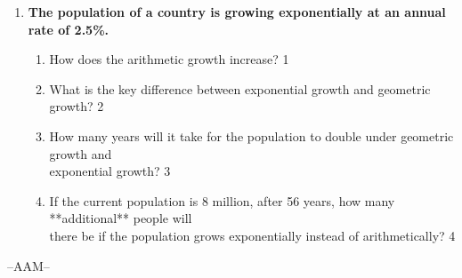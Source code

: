 \documentclass[12pt]{article}
\begin{document}
\begin{enumerate}
  \begin{enumerate}
    \item What is a discrete random variable? \hfill 1
    \item What are the required properties of a probability distribution? \hfill 2
  
    \item
    	Calculate the marginal probability \( P(Y) \). \hfill 3
    \item
     	Determine \( P(Y \vert X = 1) \) and \( P(Y \vert X = 0) \). \hfill 4
  \end{enumerate}
  
  
 \item
  \textbf{The population of a country is growing exponentially at an annual rate of 2.5\%.}

  
  \begin{enumerate}
    \item
	How does the arithmetic growth increase? \hfill 1
    \item
    What is the key difference between exponential growth and geometric growth? \hfill 2
  \item
How many years will it take for the population to double under geometric growth and \\ exponential growth? \hfill 3

\item
If the current population is 8 million, after 56 years, how many **additional** people will \\ there be if the population grows exponentially instead of arithmetically? \hfill 4
  \end{enumerate}

\end{enumerate}

 \vspace{2.5cm}

\begin{center}

  \vfill
  --AAM--
\end{center}
\end{document}
